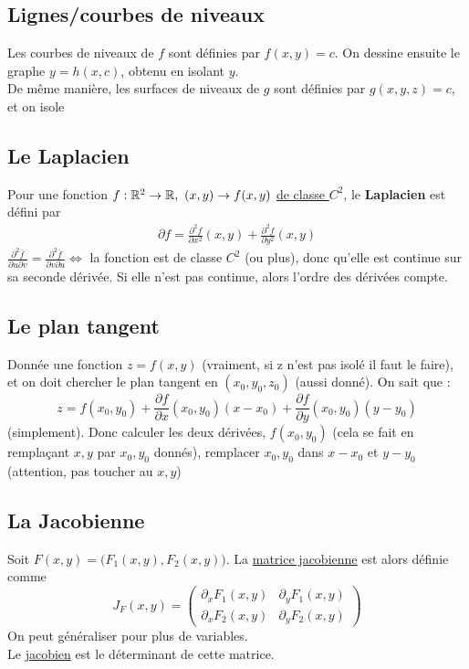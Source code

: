 \documentclass[12pt,a4paper]{article}
\renewcommand{\)}{\right)}
\renewcommand{\(}{\left(}
\begin{document}
\subsection{Lignes/courbes de niveaux}
Les courbes de niveaux de $f$ sont définies par $f(x,y) = c$. On dessine ensuite le graphe $y = h(x,c)$, obtenu en isolant $y$.\\
De même manière, les surfaces de niveaux de $g$ sont définies par $g(x,y,z) = c$, et on isole 	
\subsection{Le Laplacien}
Pour une fonction $f : \mathbb{R}^2 \to \mathbb{R},\ (x,y) \to f(x,y)$ \uline{de classe $C^2$}, le \textbf{Laplacien} est défini par
\begin{align*}
	\partial f = \frac{\partial^2 f}{\partial x^2}(x,y) + \frac{\partial^2 f}{\partial y^2}(x,y)
\end{align*}
 $\frac{\partial^2 \overline{f}}{\partial u \partial v} = \frac{\partial^2 \overline{f}}{\partial v \partial u} \iff$ la fonction est de classe $C^2$ (ou plus), donc qu'elle est continue sur sa seconde dérivée. Si elle n'est pas continue, alors l'ordre des dérivées compte.

\subsection{Le plan tangent}
Donnée une fonction $z = f(x,y)$ (vraiment, si z n'est pas isolé il faut le faire), et on doit chercher le plan tangent en $(x_0,y_0,z_0)$ (aussi donné). On sait que :
\begin{equation*}
	z = f(x_0,y_0)+\frac{\partial f}{\partial x}(x_0,y_0)(x-x_0) + \frac{\partial f}{\partial y}(x_0,y_0)(y-y_0)
\end{equation*}
(simplement). Donc calculer les deux dérivées, $f(x_0,y_0)$ (cela se fait en remplaçant $x,y$ par $x_0,y_0$ donnés), remplacer $x_0,y_0$ dans $x-x_0$ et $y-y_0$ (attention, pas toucher au $x,y$)

\subsection{La Jacobienne}
Soit $F(x,y) = \big(F_1(x,y),F_2(x,y)\big)$. La \uline{matrice jacobienne} est alors définie comme
\[J_F(x,y) = 
\begin{pmatrix}
	\partial_x F_1(x,y) & \partial_y F_1(x,y)\\
	\partial_x F_2(x,y) & \partial_y F_2(x,y)
\end{pmatrix}\]
On peut généraliser pour plus de variables.\\
Le \uline{jacobien} est le déterminant de cette matrice.
\end{document}
